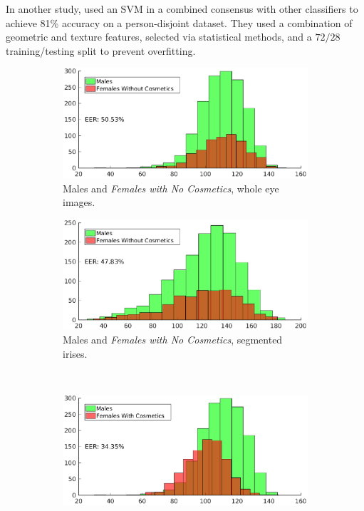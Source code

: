 \documentclass[10pt,twocolumn,letterpaper]{article}
\begin{document}
In another study, \cite{Fairhurst2015} used an SVM in a combined consensus with other classifiers to achieve 81\% accuracy on a person-disjoint dataset. 
They used a combination of geometric and texture features, selected via statistical methods, and a $72/28$ training/testing split to prevent overfitting.

\begin{figure}[!htbp]
    \captionsetup[subfigure]{justification=centering}
    \centering
    \begin{subfigure}[b]{0.45\textwidth}
        \centering
        \includegraphics[width=\textwidth]{img/males_vs_nocosmetics_short.eps}
        \caption{Males and \textit{Females with No Cosmetics}, whole eye images.}
        \label{fig:disteyefnc}
    \end{subfigure}
    \hfill
    \begin{subfigure}[b]{0.45\textwidth}
        \centering
        \includegraphics[width=\textwidth]{img/males_vs_nocosmetics_segmented_short.eps}
        \caption{Males and \textit{Females with No Cosmetics}, segmented irises.}
        \label{fig:distirisfnc}
    \end{subfigure}
    \\
    \begin{subfigure}[b]{0.45\textwidth}
        \centering
        \includegraphics[width=\textwidth]{img/males_vs_cosmetics_short.eps}

\end{subfigure}
\end{figure}
\end{document}
